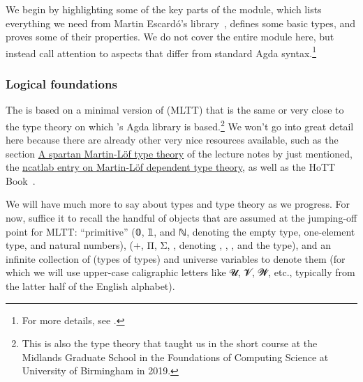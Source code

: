 We begin by highlighting some of the key parts of the module, which lists everything we need from Martin Escard\'o's \typetopology library~\cite{MHE}, defines some basic types, and proves some of their properties.  We do not cover the entire  module here, but instead call attention to aspects that differ from standard Agda syntax.\footnote{For more details, see .}

\subsubsection{Logical foundations}\label{sec:logical-foundations}

The \agdaualib is based on a minimal version of  (MLTT) that is the same or very close to the type theory on which \MartinEscardo's \TypeTopology Agda library is based.\footnote{This is also the type theory that \escardo taught us in the short course \ufcourse at the Midlands Graduate School in the Foundations of Computing Science at University of Birmingham in 2019.} We won't go into great detail here because there are already other very nice resources available, such as the section \href{https://www.cs.bham.ac.uk/~mhe/HoTT-UF-in-Agda-Lecture-Notes/HoTT-UF-Agda.html\#mlttinagda}{A spartan Martin-Löf type theory} of the lecture notes by \escardo just mentioned, the \href{https://ncatlab.org/nlab/show/Martin-L\%C3\%B6f+dependent+type+theory}{ncatlab entry on Martin-Löf dependent type theory}, as well as the HoTT Book~\cite{HoTT}.

We will have much more to say about types and type theory as we progress. For now, suffice it to recall the handful of objects that are assumed at the jumping-off point for MLTT: ``primitive''  (\ad 𝟘, \ad 𝟙, and \ad ℕ, denoting the empty type, one-element type, and natural numbers),  (\ad +, \ad Π, \ad Σ, , denoting , , , and the  type), and an infinite collection of  (types of types) and universe variables to denote them (for which we will use upper-case caligraphic letters like \ab 𝓤, \ab 𝓥, \ab 𝓦, etc., typically from the latter half of the English alphabet).

